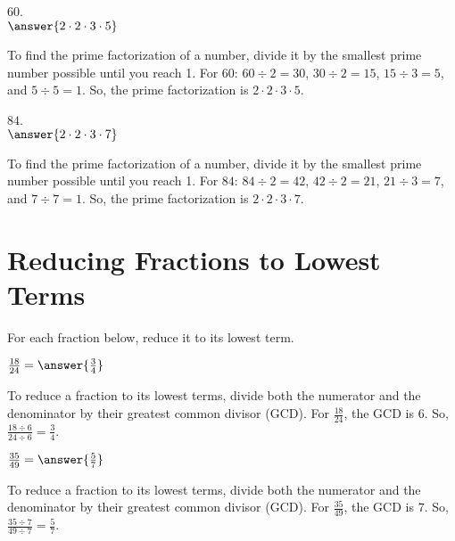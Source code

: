 \documentclass{ximera}
\begin{document}
\begin{problem}
$60$.\\
$\answer{2 \cdot 2 \cdot 3 \cdot 5}$
\begin{feedback}
To find the prime factorization of a number, divide it by the smallest prime number possible until you reach 1. For $60$: $60 \div 2 = 30$, $30 \div 2 = 15$, $15 \div 3 = 5$, and $5 \div 5 = 1$. So, the prime factorization is $2 \cdot 2 \cdot 3 \cdot 5$.
\end{feedback}
\end{problem}

\begin{problem}
$84$.\\
$\answer{2 \cdot 2 \cdot 3 \cdot 7}$
\begin{feedback}
To find the prime factorization of a number, divide it by the smallest prime number possible until you reach 1. For $84$: $84 \div 2 = 42$, $42 \div 2 = 21$, $21 \div 3 = 7$, and $7 \div 7 = 1$. So, the prime factorization is $2 \cdot 2 \cdot 3 \cdot 7$.
\end{feedback}
\end{problem}



\section*{Reducing Fractions to Lowest Terms}

For each fraction below, reduce it to its lowest term.

\begin{problem}
$\frac{18}{24} = \answer{\frac{3}{4}}$
\begin{feedback}
To reduce a fraction to its lowest terms, divide both the numerator and the denominator by their greatest common divisor (GCD). For $\frac{18}{24}$, the GCD is $6$. So, $\frac{18 \div 6}{24 \div 6} = \frac{3}{4}$.
\end{feedback}
\end{problem}

\begin{problem}
$\frac{35}{49} = \answer{\frac{5}{7}}$
\begin{feedback}
To reduce a fraction to its lowest terms, divide both the numerator and the denominator by their greatest common divisor (GCD). For $\frac{35}{49}$, the GCD is $7$. So, $\frac{35 \div 7}{49 \div 7} = \frac{5}{7}$.
\end{feedback}
\end{problem}
\end{document}
